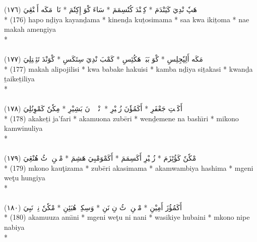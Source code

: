 \documentclass[a4paper, 12pt]{report}
\begin{document}
\begin{center}
\textarabic{(١٧٦) \textcolor{mygreen}{هَپٗ نْدِيَ كَيَنْدَمَ  * كِنٖنْدَ كُتٗسِمَمَ  * سَاءَ كْوَ إِكِتٗمَ  * نَاءٖ مَكَه أَمٖنْڠِيَ }} \\* 
(176) hapo nḏiya kayanḏama  * kinenḏa kuṯosimama  * saa kwa ikiṯoma  * nae makah amengiya  \\* 
 \\ 
\\[8mm] 

\textarabic{(١٧٧) \textcolor{mygreen}{مَكَه أَلِپٗجِلِسِ  * كْوَ بَبَكٖ هَكُئِسِ  * كَمْبَ نْدِيَ سِتَكَسِ  * كْوَنْدَ تَئِكٖتِلِيَ }} \\* 
(177) makah alipojilisi  * kwa babake hakuisi  * kamba nḏiya siṯakasi  * kwanḏa ṯaikeṯiliya  \\* 
 \\ 
\\[8mm] 

\textarabic{(١٧٨) \textcolor{mygreen}{أَكَكٖتِ جَعْفَرِ  * أَكَمُؤٗنَ زُبٖيْرِ  * وٖنْدٖمٖنٖ نَ بَشِيْرِ  * مِكٗنٗ كَمْوِنُلِيَ }} \\* 
(178) akakeṯi ja'fari  * akamuona zubēri  * wenḏemene na bashı̄ri  * mikono kamwinuliya  \\* 
 \\ 
\\[8mm] 

\textarabic{(١٧٩) \textcolor{mygreen}{مْكٗنٗ كَؤُٹِزَمَ  * زُبٖيْرِ أَكَسِمَمَ  * أَكَمْوَمْبِيَ هَشِمَ  * مْڠٖنِ وٖٹُ هُنْڠِيَ }} \\* 
(179) mkono kauţizama  * zubēri akasimama  * akamwambiya hashima  * mgeni weţu hungiya  \\* 
 \\ 
\\[8mm] 

\textarabic{(١٨٠) \textcolor{mygreen}{أَكَمُؤُزَ أَمِيْنِ  * مْڠٖنِ وٖٹُ نِ نَنِ  * وَسِكِيٖ هُبَئِنِ  * مْكٗنٗ نِپٖ نَبِيَ }} \\* 
(180) akamuuza amı̄ni  * mgeni weţu ni nani  * wasikiye hubaini  * mkono nipe nabiya  \\* 
 \\ 
\\[8mm] 


\end{center}
\end{document}
